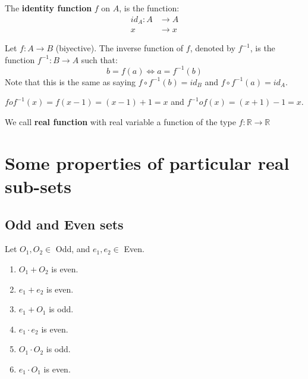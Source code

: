 \documentclass[12pt, a4paper]{book}
\begin{document}
\begin{defn}
  \boldmath
  The \textbf{identity function} $f$ on $A$, is the function:
  \begin{align*}
    {id}_A:A &\longrightarrow A \\
    x &\longrightarrow x
  \end{align*}
  \unboldmath
\end{defn}

\begin{defn}
  \boldmath
  Let $f:A\longrightarrow B$ (biyective). The inverse function of $f$, denoted by $f^{-1}$, is the function $f^{-1}:B \longrightarrow A$ such that:
  \[
    b = f(a) \Leftrightarrow a = f^{-1}(b)
  \]
  Note that this is the same as saying $f \circ f^{-1}(b) = {id}_B$ and $f \circ f^{-1}(a) = {id}_A$.
  \unboldmath
\end{defn}

\begin{exmp}
  $f o f^{-1}(x) = f(x-1) = (x-1)+1 = x$ and $f^{-1} o f(x) = (x+1)-1 = x$.
\end{exmp}

\begin{defn}
  We call \textbf{real function} with real variable a function of the type $f:\mathbb{R} \longrightarrow \mathbb{R}$
\end{defn}

\section{Some properties of particular real sub-sets}

\subsection{Odd and Even sets}

\begin{proposition}
  \boldmath
  Let $O_1,O_2 \in$ Odd, and $e_1,e_2 \in$ Even.
  \begin{enumerate}[label=\emph{\alph*})]
    \item $O_1 + O_2$ is even.
    \item $e_1 + e_2$ is even.
    \item $e_1 + O_1$ is odd.
    \item $e_1 \cdot e_2$ is even.
    \item $O_1 \cdot O_2$ is odd.
    \item $e_1 \cdot O_1$ is even.
  \end{enumerate}
  \unboldmath
\end{proposition}
\end{document}
